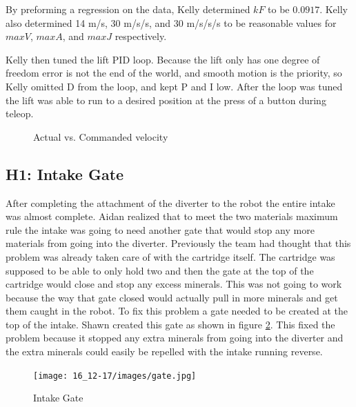 \documentclass{article}
\begin{document}
By preforming a regression on the data, Kelly determined $kF$ to be $0.0917$. Kelly also determined 14 m/s, 30 m/s/s, and 30 m/s/s/s to be reasonable values for $maxV$, $maxA$, and $maxJ$ respectively.

Kelly then tuned the lift PID loop. Because the lift only has one degree of freedom error is not the end of the world, and smooth motion is the priority, so Kelly omitted D from the loop, and kept P and I low. After the loop was tuned the lift was able to run to a desired position at the press of a button during teleop.

\begin {figure}
\centering
{}
\caption {Actual vs. Commanded velocity}
\label {fig:graph}
\end{figure}
\subsection{H1: Intake Gate}

After completing the attachment of the diverter to the robot the entire intake was almost complete. Aidan realized that to meet the two materials maximum rule the intake was going to need another gate that would stop any more materials from going into the diverter. Previously the team had thought that this problem was already taken care of with the cartridge itself. The cartridge was supposed to be able to only hold two and then the gate at the top of the cartridge would close and stop any excess minerals. This was not going to work because the way that gate closed would actually pull in more minerals and get them caught in the robot. To fix this problem a gate needed to be created at the top of the intake. Shawn created this gate as shown in figure \ref{fig:gate}. This fixed the problem because it stopped any extra minerals from going into the diverter and the extra minerals could easily be repelled with the intake running reverse.

\begin{figure}
    \centering
    \texttt{[image: 16\_12-17/images/gate.jpg]}
    \caption{Intake Gate}
    \label{fig:gate}
\end{figure}
\end{document}
